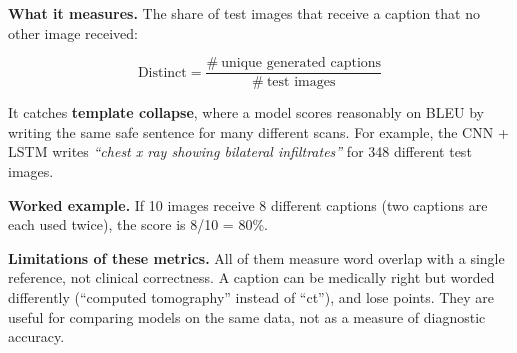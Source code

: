 \textbf{What it measures.} The share of test images that receive a caption that no other image received:

\[\text{Distinct} = \frac{\#\ \text{unique generated captions}}{\#\ \text{test images}} \tag{5.4}\]

It catches \textbf{template collapse}, where a model scores reasonably on BLEU by writing the same safe sentence for many different scans. For example, the CNN + LSTM writes \emph{``chest x ray showing bilateral infiltrates''} for 348 different test images.

\begin{examplebox}

\textbf{Worked example.} If 10 images receive 8 different captions (two captions are each used twice), the score is 8/10 = 80\%.

\end{examplebox}

\textbf{Limitations of these metrics.} All of them measure word overlap with a single reference, not clinical correctness. A caption can be medically right but worded differently (``computed tomography'' instead of ``ct''), and lose points. They are useful for comparing models on the same data, not as a measure of diagnostic accuracy.
